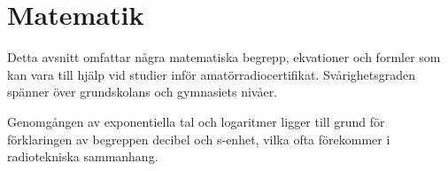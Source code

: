 \chapter{Matematik}


Detta avsnitt omfattar några matematiska begrepp, ekvationer och formler som kan
vara till hjälp vid studier inför amatörradiocertifikat.
Svårighetsgraden spänner över grundskolans och gymnasiets nivåer.

Genomgången av exponentiella tal och logaritmer ligger till grund för
förklaringen av begreppen decibel och s-enhet, vilka ofta förekommer i
radiotekniska sammanhang.




